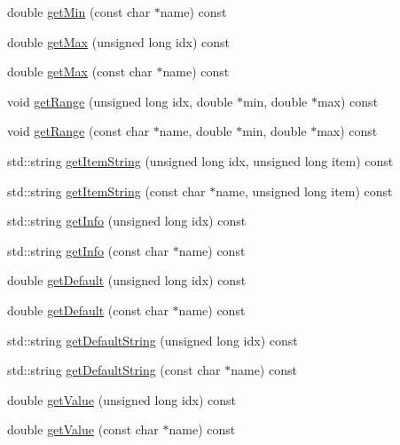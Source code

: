 \begin{DoxyCompactItemize}
double \hyperlink{class_frame_lib___parameters_ac188e94ada437c42fceac7f1c502c536}{get\+Min} (const char $\ast$name) const
\item 
double \hyperlink{class_frame_lib___parameters_a6d18778368a98852e2d710748ecea5fb}{get\+Max} (unsigned long idx) const
\item 
double \hyperlink{class_frame_lib___parameters_a9b1b814d8df6fed63adb0854383df279}{get\+Max} (const char $\ast$name) const
\item 
void \hyperlink{class_frame_lib___parameters_a9addab9977edd69cc6cfa7b5f4a70a9d}{get\+Range} (unsigned long idx, double $\ast$min, double $\ast$max) const
\item 
void \hyperlink{class_frame_lib___parameters_a3287eb6847370554758129162e5eff11}{get\+Range} (const char $\ast$name, double $\ast$min, double $\ast$max) const
\item 
std\+::string \hyperlink{class_frame_lib___parameters_a19f6d2862f0b6c2a9fffa496362beef1}{get\+Item\+String} (unsigned long idx, unsigned long item) const
\item 
std\+::string \hyperlink{class_frame_lib___parameters_a5cda6528deb6a8a306b6de6f7eeaa2fb}{get\+Item\+String} (const char $\ast$name, unsigned long item) const
\item 
std\+::string \hyperlink{class_frame_lib___parameters_a6e90c72b4f3ece2ab4fe7dd893d399e3}{get\+Info} (unsigned long idx) const
\item 
std\+::string \hyperlink{class_frame_lib___parameters_aa278b4f3ac4bb743e2941fd004748133}{get\+Info} (const char $\ast$name) const
\item 
double \hyperlink{class_frame_lib___parameters_a6d28eb24ae285237724b2249f342c3d8}{get\+Default} (unsigned long idx) const
\item 
double \hyperlink{class_frame_lib___parameters_a2524dc5f2566eb521f95a342eb980239}{get\+Default} (const char $\ast$name) const
\item 
std\+::string \hyperlink{class_frame_lib___parameters_aa6544b983343464c17299ab6f1874bce}{get\+Default\+String} (unsigned long idx) const
\item 
std\+::string \hyperlink{class_frame_lib___parameters_aa8481b077e92ff7548123b97411280a1}{get\+Default\+String} (const char $\ast$name) const
\item 
double \hyperlink{class_frame_lib___parameters_a64dc41237eccad96a857b4f675f4054d}{get\+Value} (unsigned long idx) const
\item 
double \hyperlink{class_frame_lib___parameters_afa54042c7a35164482fcba5112bd3e24}{get\+Value} (const char $\ast$name) const

\end{DoxyCompactItemize}
